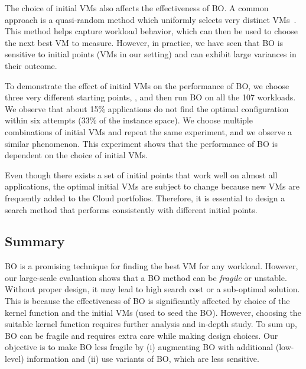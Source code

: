The choice of initial VMs also affects the effectiveness of BO. A common approach is a quasi-random method which uniformly selects very distinct VMs~\cite{Sobol1998}.
This method helps capture workload behavior, which can then be used to choose the next best VM to measure.
However, in practice, we have seen that BO is sensitive to initial points (VMs in our setting) and can exhibit large variances in their outcome.

To demonstrate the effect of initial VMs on the performance of BO, we choose three very different starting points, , and then
run BO on all the 107 workloads. We observe that about 15\% applications do not find
the optimal configuration within six attempts (33\% of the instance space). 
We choose multiple combinations of initial VMs and repeat the same experiment,
and we observe a similar phenomenon. 
This experiment shows that the performance of BO is dependent on the choice of initial VMs.

Even though there exists a set of initial points that work well
on almost all applications,
the optimal initial VMs are subject to change because new VMs
are frequently added to the Cloud portfolios. Therefore, it is essential to design a search method that performs consistently with different initial points.


\subsection*{Summary}

BO is a promising technique for finding the best VM for any workload.
However, our large-scale evaluation shows that a BO method can be \textit{fragile} or unstable.
Without proper design, it may lead to high search cost or a sub-optimal solution. This is because the effectiveness of BO is significantly affected by choice of the kernel function and the initial VMs (used to seed the BO). However, choosing the suitable kernel function requires
further analysis and in-depth study.
To sum up, BO can be fragile and requires extra care while making design choices.
Our objective is to make BO less fragile by (i) augmenting BO with additional (low-level) information and (ii) use variants of BO, which are less sensitive.
